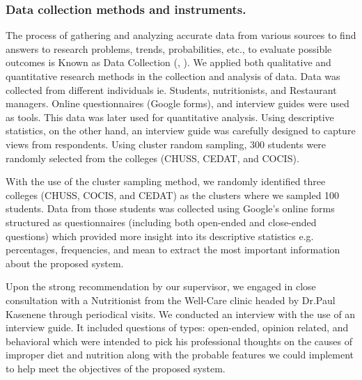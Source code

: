 \documentclass{article}
\begin{document}
\subsubsection{Data collection methods and instruments.}
The process of gathering and analyzing accurate data from various sources to find answers to research problems, trends, probabilities, etc., to evaluate possible outcomes is Known as Data Collection (\citeauthor{Simplelearn}, \citeyear{Simplelearn}). We applied both qualitative and quantitative research methods in the collection and analysis of data. Data was collected from different individuals ie. Students, nutritionists, and Restaurant managers. Online questionnaires (Google forms), and interview guides were used as tools. This data was later used for quantitative analysis. 
Using descriptive statistics, on the other hand, an interview guide was carefully designed to capture views from respondents.
Using cluster random sampling, 300 students were randomly selected from the colleges (CHUSS, CEDAT, and COCIS).

\vspace{10pt}

\noindent With the use of the cluster sampling method, we randomly identified three colleges (CHUSS, COCIS, and CEDAT) as the clusters where we sampled 100 students. Data from those students was collected using Google’s online forms structured as questionnaires (including both open-ended and close-ended questions) which provided more insight into its descriptive statistics e.g. percentages, frequencies, and mean to extract the most important information about the proposed system.

\vspace{10pt}

\noindent Upon the strong recommendation by our supervisor, we engaged in close consultation with a Nutritionist from the Well-Care clinic headed by Dr.Paul Kasenene through periodical visits.
We conducted an interview with the use of an interview guide. It included questions of types:  open-ended, opinion related, and behavioral which were intended to pick his professional thoughts on the causes of improper diet and nutrition along with the probable features we could implement to help meet the objectives of the proposed system.

\vspace{10pt}
\end{document}
